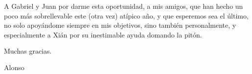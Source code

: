 \documentclass[11pt,a4paper,titlepage,twoside,openright,openbib,spanish]{report}
\begin{document}


\paxinaenbranco
\begin{flushright}
\end{flushright}
\paxinaenbranco
\paxinaenbranco
\begin{agradecementos}
A Gabriel y Juan por darme esta oportunidad, a mis amigos, que han hecho un poco más sobrellevable este (otra vez) atípico año, y que esperemos sea el último, no solo apoyándome siempre en mis objetivos, sino también personalmente, y especialmente a Xián por su inestimable ayuda domando la pitón.

Muchas gracias.

\begin{flushright}
Alonso
\end{flushright}
\end{agradecementos}
\pagestyle{empty}
\paxinaenbranco

\pagestyle{fancy}

\setcounter{page}{1}

\tableofcontents
\listoffigures
\listoftables
\cleardoublepage

\setcounter{page}{1}







% 
% 



\appendix
\appendixpage
% 
% 
% 




\cleardoublepage
\end{document}
